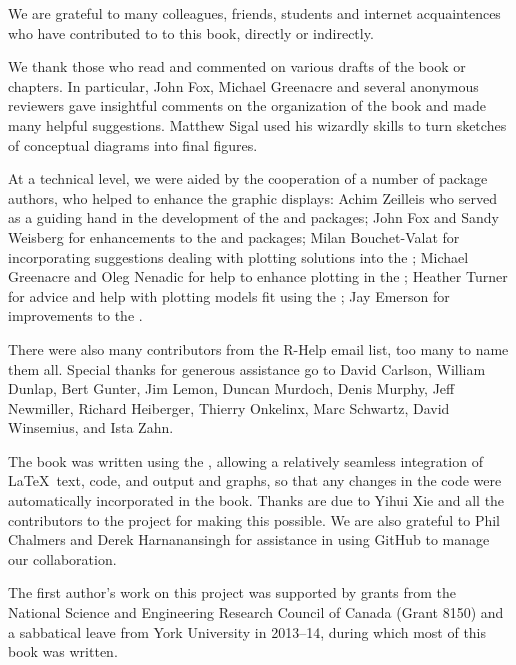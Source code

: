 We are grateful to many colleagues, friends, students and internet acquaintences who have contributed to
to this book, directly or indirectly.

We thank those who read and commented on various drafts of the book or chapters.
In particular, John Fox, Michael Greenacre and several anonymous reviewers gave
insightful comments on the organization of the book and made many helpful suggestions.
Matthew Sigal used his wizardly skills to turn sketches of conceptual diagrams into
final figures.

At a technical level, we were aided by the cooperation of a number of \R package authors, who
helped to enhance the graphic displays:
Achim Zeilleis who served as a guiding hand in the development of the  and  packages;
John Fox and Sandy Weisberg for enhancements to the  and  packages;
Milan Bouchet-Valat for incorporating suggestions dealing with plotting  solutions into the ;
Michael Greenacre and Oleg Nenadic for help to enhance plotting in the ;
Heather Turner for advice and help with plotting models fit using the ;
Jay Emerson for improvements to the .

There were also many contributors from the R-Help email list, too many to name them all.
Special thanks for generous assistance go to
David Carlson,
William Dunlap,
Bert Gunter,
Jim Lemon,
Duncan Murdoch,
Denis Murphy,
Jeff Newmiller,
Richard Heiberger,
Thierry Onkelinx,
Marc Schwartz,
David Winsemius, and
Ista Zahn.

The book was written using the , allowing a relatively seamless 
integration of \LaTeX\  text, \R code, and \R output and graphs, so that any changes
in the code were automatically incorporated in the book.
Thanks are due to Yihui Xie and all the contributors to the  project
for making this possible.  We are also grateful to Phil Chalmers and Derek Harnanansingh
for assistance in using GitHub to manage our collaboration.

The first author's work on this project was supported by grants from the
National Science and Engineering Research Council of Canada (Grant 8150)
and a sabbatical leave from York University in 2013--14, during which most
of this book was written.

